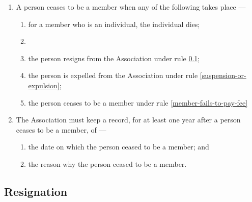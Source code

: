 \documentclass[../constitution.tex]{subfiles}
\begin{document}
\begin{enumerate}

\item A person ceases to be a member when any of the following takes place ---

  \begin{enumerate}
  
  \item for a member who is an individual, the individual dies;
  \item {} 
  \item the person resigns from the Association under rule \ref{resignation};
  \item the person is expelled from the Association under rule \ref{suspension-or-expulsion};
  \item the person ceases to be a member under rule \ref{member-fails-to-pay-fee}
  \end{enumerate}
\item The Association must keep a record, for at least one year after a person ceases to be a member, of ---

  \begin{enumerate}
  
  \item the date on which the person ceased to be a member; and
  \item the reason why the person ceased to be a member.
  \end{enumerate}
\end{enumerate}


\subsection{Resignation} \label{resignation}
\end{document}
